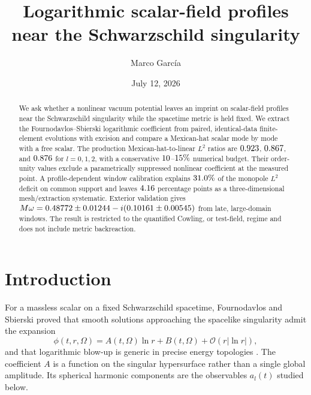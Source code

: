 \documentclass[
  aps,
  prd,
  reprint,
  superscriptaddress,
  nofootinbib,
  longbibliography
]{revtex4-2}
\newcommand{\order}{\mathcal{O}}
\begin{document}
\title{Logarithmic scalar-field profiles near the Schwarzschild singularity}

\author{Marco Garc\'ia}

\date{July 12, 2026}

\begin{abstract}
We ask whether a nonlinear vacuum potential leaves an imprint on scalar-field
profiles near the Schwarzschild singularity while the spacetime metric is
held fixed.  We extract the Fournodavlos--Sbierski logarithmic coefficient
from paired, identical-data finite-element evolutions with excision and
compare a Mexican-hat scalar mode by mode with a free scalar.
The production Mexican-hat-to-linear $L^2$ ratios are $0.923$,
$0.867$, and $0.876$ for $l=0,1,2$, with a conservative
$10$--$15\%$ numerical budget.  Their
order-unity values exclude a parametrically suppressed nonlinear coefficient
at the measured point.
A profile-dependent window calibration explains $31.0\%$
of the monopole $L^2$ deficit on common support and leaves
$4.16$ percentage points as a three-dimensional
mesh/extraction systematic.
Exterior validation gives $M\omega=0.48772\pm0.01244
-i(0.10161\pm0.00545)$ from late, large-domain
windows.  The result is restricted to the quantified Cowling, or test-field,
regime and does not include metric backreaction.
\end{abstract}

\maketitle

\section{Introduction}
\label{sec:intro}

For a massless scalar on a fixed Schwarzschild spacetime,
Fournodavlos and Sbierski proved that smooth solutions approaching the
spacelike singularity admit the expansion
\begin{equation}
  \phi(t,r,\Omega)
  = A(t,\Omega)\ln r+B(t,\Omega)+\order(r\lvert\ln r\rvert),
  \label{eq:fs-expansion}
\end{equation}
and that logarithmic blow-up is generic in precise energy topologies
\cite{FournodavlosSbierski2020}.  The coefficient $A$ is a function on the
singular hypersurface rather than a single global amplitude.  Its spherical
harmonic components are the observables $a_l(t)$ studied below.
\end{document}
